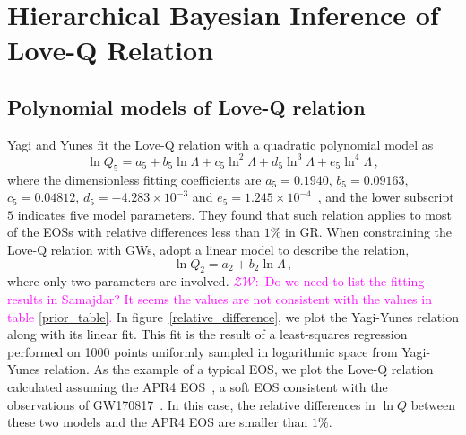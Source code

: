 \documentclass[a4paper,11pt]{article}
\newcommand{\ZW}[1]{\textcolor{magenta}{$\mathcal{ZW}$:~#1}}
\begin{document}
\section{Hierarchical Bayesian Inference of Love-Q Relation}
\label{sec:framework}

\subsection{Polynomial models of Love-Q relation} 
\label{subsec:framework_parameterization}
Yagi and Yunes fit the Love-Q relation with a quadratic polynomial model as~\cite{Yagi:2013bca,Yagi:2013awa,Yagi_2017}
\begin{equation}
\label{5-d_Love_Q_eq}
    \ln Q_{5}=a_5 + b_5 \ln \Lambda + c_5 \ln^2\Lambda + d_5 \ln^3\Lambda + e_5 \ln^4 \Lambda\,,
\end{equation}
where the dimensionless fitting coefficients are 
$a_5=0.1940$, $b_5=0.09163$, $c_5=0.04812$, 
$d_5=-4.283\times 10^{-3}$ and $e_5=1.245\times 10^{-4}$~\cite{Yagi_2017}, and 
the lower subscript $5$ indicates five model parameters.
They found that such relation applies to most of the EOSs with 
relative differences less than $1\%$ in GR. When constraining the Love-Q
relation with GWs, \citet{Samajdar:2020xrd} adopt a linear model to describe the relation,
\begin{equation}
\label{2-d_Love_Q_eq}
    \ln Q_{2} = a_2 + b_2 \ln \Lambda\,,
\end{equation}
where only two parameters are involved. \ZW{Do we need to list the fitting
results in Samajdar? It seems the values are not consistent with the values in
table \ref{prior_table}.}
In figure~\ref{relative_difference}, we plot the Yagi-Yunes relation along with 
its linear fit. This fit is the result of a least-squares regression performed on 1000 points uniformly sampled in logarithmic space from Yagi-Yunes relation. 
As the example of a typical EOS, we plot the Love-Q relation calculated assuming the APR4 
EOS~\cite{PhysRevC.58.1804}, a soft EOS consistent with the 
observations of GW170817~\cite{LIGOScientific:2017vwq,LIGOScientific:2018cki,
LIGOScientific:2018hze}. In this case, the relative differences in $\ln Q$ between 
these two models and the APR4 EOS are smaller than $1\%$. 
\end{document}
